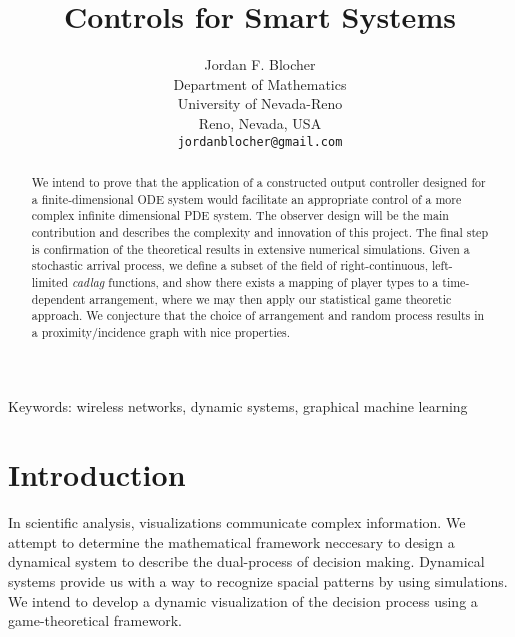 \documentclass[11pt]{article}
\title{Controls for Smart Systems}
\author{{\sc Jordan F. Blocher}\\ 
Department of Mathematics\\ 
University of Nevada-Reno\\ 
Reno, Nevada, USA\\
{\tt jordanblocher@gmail.com}}
\theoremstyle{definition}
\begin{document}
 
\baselineskip6mm\parskip4mm

\maketitle

\begin{abstract}

We intend to prove that the application of a constructed output controller designed for a finite-dimensional ODE system would facilitate an appropriate control of a more complex infinite dimensional PDE system. The observer design will be the main contribution and describes the complexity and innovation of this project. The final step is confirmation of the theoretical results in extensive numerical simulations.
Given a stochastic arrival process, we define a subset of the field of
right-continuous, left-limited \emph{cadlag} 
functions, and show there exists a mapping of player types to a time-dependent
arrangement, where we may then apply our statistical game theoretic approach.
We conjecture that the choice of arrangement and random process results in a
proximity/incidence graph with nice properties.

\end{abstract}
 
{\small\sc Keywords:} {\small wireless networks, dynamic systems, graphical machine learning} 
 

\section{Introduction}

In scientific analysis, visualizations communicate complex information. We
attempt to determine the mathematical framework neccesary to design a dynamical
system to describe the dual-process of decision making. Dynamical systems provide us with
a way to recognize spacial patterns by using simulations. We intend to develop a
dynamic visualization of the decision process using a game-theoretical
framework. 
\end{document}
